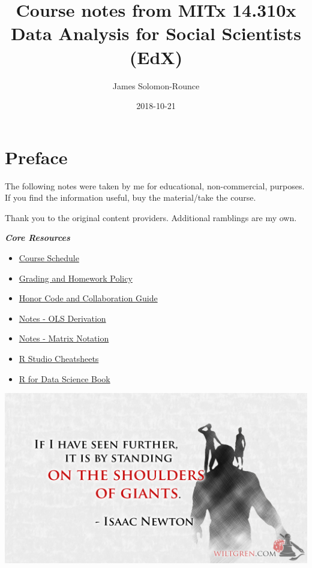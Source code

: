 \documentclass[]{book}
\title{Course notes from MITx 14.310x Data Analysis for Social Scientists (EdX)}
\author{James Solomon-Rounce}
\date{2018-10-21}
\providecommand{\tightlist}{%
  \setlength{\itemsep}{0pt}\setlength{\parskip}{0pt}}
\theoremstyle{definition}
\theoremstyle{definition}
\theoremstyle{definition}
\theoremstyle{remark}
\begin{document}
\maketitle

{
\setcounter{tocdepth}{1}
\tableofcontents
}
\chapter*{Preface}\label{preface}

The following notes were taken by me for educational, non-commercial,
purposes. If you find the information useful, buy the material/take the
course.

Thank you to the original content providers. Additional ramblings are my
own.

\textbf{\emph{Core Resources}}

\begin{itemize}
\tightlist
\item
  \href{./files/14.310x_3T2018_Schedule.pdf}{Course Schedule}
\item
  \href{./files/14.310x_Grading_and_Homework_Policy__3T2018.pdf}{Grading
  and Homework Policy}
\item
  \href{./files/14310x_Honor_Code_and_Collaboration_Guidelines.pdf}{Honor
  Code and Collaboration Guide}
\item
  \href{./files/Derivation_of_OLS_Estimators.pdf}{Notes - OLS
  Derivation}
\item
  \href{./files/Matrix_Notation_etc.pdf}{Notes - Matrix Notation}
\item
  \href{https://www.rstudio.com/resources/cheatsheets/}{R Studio
  Cheatsheets}
\item
  \href{http://r4ds.had.co.nz/index.html}{R for Data Science Book}
\end{itemize}

\includegraphics[width=1\linewidth]{images/standing}
\end{document}
